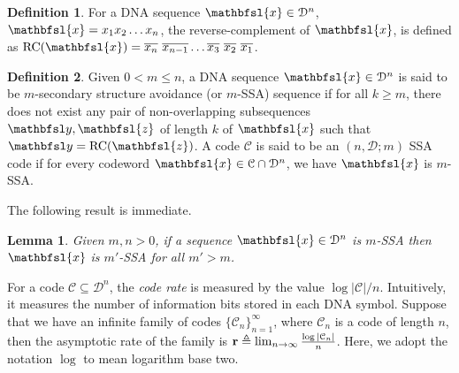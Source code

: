 \documentclass[conference]{IEEEtran}
\theoremstyle{plain}
\newtheorem{lemma}{Lemma}
\theoremstyle{definition}
\newtheorem{definition}{Definition}
\newtheorem{example}{Example}
\newcommand{\C}{{\mathcal C}}
\newcommand{\D}{{\mathcal D}}
\newcommand{\by}{{\mathbfsl y}}
\newcommand{\bx}{{\mathbfsl{x}}}
\newcommand{\bz}{{\mathbfsl{z}}}
\renewcommand{\ge}{\geqslant}
\renewcommand{\le}{\leqslant}
\begin{document}
\begin{definition}
For a DNA sequence $\bx \in \D^n$, $\bx=x_1x_2\ldots x_n$, the reverse-complement of $\bx$, is defined as ${\rm RC}({\bx})={\overline{x_n}} \text{ } \overline{x_{n-1}}\ldots  \overline{x_3}  \text{ } \overline{x_2}  \text{ } \overline{x_1}$. %
\end{definition}

\begin{definition}
Given $0<m\le n$, a DNA sequence $\bx\in \D^n$ is said to be $m$-secondary structure avoidance (or $m$-SSA) sequence if for all $k\ge m$, there does not exist any pair of non-overlapping subsequences $\by, \bz$ of length $k$ of $\bx$ such that $\by={\rm RC}({\bz})$. A code $\C$ is said to be an $(n,\D;m)$ SSA code if for every codeword $\bx\in \C \cap \D^n$, we have $\bx$ is $m$-SSA. 
\end{definition}

The following result is immediate. 
\begin{lemma}\label{lemma1}
Given $m,n>0$, if a sequence $\bx\in \D^n$ is  $m$-SSA then $\bx$ is $m'$-SSA for all $m'>m$. 
\end{lemma}


For a code $\C \subseteq \D^n$, the {\em code rate} is measured by the value $\log |\C|/n$. Intuitively, it measures the number of information bits stored in each DNA symbol.  Suppose that we have an infinite family of codes $\{\C_n\}_{n=1}^\infty$, where $\C_n$ is a code of length $n$, then the asymptotic rate of the family is ${\bf r} \triangleq \lim_{n\to \infty} \frac{\log |\C_n|}{n}$. Here, we adopt the notation $\log$ to mean logarithm base two. %
\end{document}
